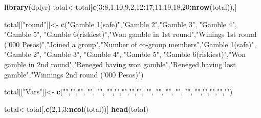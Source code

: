 \documentclass[]{article}
\newenvironment{Shaded}{\begin{snugshade}}{\end{snugshade}}
\newcommand{\KeywordTok}[1]{\textcolor[rgb]{0.13,0.29,0.53}{\textbf{#1}}}
\newcommand{\DecValTok}[1]{\textcolor[rgb]{0.00,0.00,0.81}{#1}}
\newcommand{\StringTok}[1]{\textcolor[rgb]{0.31,0.60,0.02}{#1}}
\newcommand{\OperatorTok}[1]{\textcolor[rgb]{0.81,0.36,0.00}{\textbf{#1}}}
\newcommand{\NormalTok}[1]{#1}
\begin{document}
\begin{Shaded}
\begin{Highlighting}[]
\KeywordTok{library}\NormalTok{(dplyr)}
\NormalTok{total<-total[}\KeywordTok{c}\NormalTok{(}\DecValTok{3}\OperatorTok{:}\DecValTok{8}\NormalTok{,}\DecValTok{1}\NormalTok{,}\DecValTok{10}\NormalTok{,}\DecValTok{9}\NormalTok{,}\DecValTok{2}\NormalTok{,}\DecValTok{12}\OperatorTok{:}\DecValTok{17}\NormalTok{,}\DecValTok{11}\NormalTok{,}\DecValTok{19}\NormalTok{,}\DecValTok{18}\NormalTok{,}\DecValTok{20}\OperatorTok{:}\KeywordTok{nrow}\NormalTok{(total)),]}

\NormalTok{total[[}\StringTok{"round"}\NormalTok{]]<-}\StringTok{ }\KeywordTok{c}\NormalTok{(}\StringTok{"Gamble 1(safe)"}\NormalTok{,}\StringTok{"Gamble 2"}\NormalTok{,}\StringTok{"Gamble 3"}\NormalTok{, }\StringTok{"Gamble 4"}\NormalTok{, }\StringTok{"Gamble 5"}\NormalTok{, }\StringTok{"Gamble 6(riskiest)"}\NormalTok{,}\StringTok{"Won gamble in 1st round"}\NormalTok{,}\StringTok{"Winings 1st round ('000 Pesos)"}\NormalTok{,}\StringTok{"Joined a group"}\NormalTok{,}\StringTok{"Number of co-group members"}\NormalTok{,}\StringTok{"Gamble 1(safe)"}\NormalTok{, }\StringTok{"Gamble 2"}\NormalTok{, }\StringTok{"Gamble 3"}\NormalTok{, }\StringTok{"Gamble 4"}\NormalTok{, }\StringTok{"Gamble 5"}\NormalTok{, }\StringTok{"Gamble 6(riskiest)"}\NormalTok{,}\StringTok{"Won gamble in 2nd round"}\NormalTok{,}\StringTok{"Reneged having won gamble"}\NormalTok{,}\StringTok{"Reneged having lost gamble"}\NormalTok{,}\StringTok{"Winnings 2nd round ('000 Pesos)"}\NormalTok{)}

\NormalTok{total[[}\StringTok{"Vars"}\NormalTok{]]<-}\StringTok{ }\KeywordTok{c}\NormalTok{(}\StringTok{""}\NormalTok{,}\StringTok{""}\NormalTok{,}\StringTok{""}\NormalTok{, }\StringTok{""}\NormalTok{, }\StringTok{""}\NormalTok{, }\StringTok{""}\NormalTok{,}\StringTok{""}\NormalTok{,}\StringTok{""}\NormalTok{,}\StringTok{""}\NormalTok{,}\StringTok{""}\NormalTok{, }\StringTok{""}\NormalTok{, }\StringTok{""}\NormalTok{, }\StringTok{""}\NormalTok{, }\StringTok{""}\NormalTok{, }\StringTok{""}\NormalTok{, }\StringTok{""}\NormalTok{,}\StringTok{""}\NormalTok{,}\StringTok{""}\NormalTok{,}\StringTok{""}\NormalTok{,}\StringTok{""}\NormalTok{)}

\NormalTok{total<-total[,}\KeywordTok{c}\NormalTok{(}\DecValTok{2}\NormalTok{,}\DecValTok{1}\NormalTok{,}\DecValTok{3}\OperatorTok{:}\KeywordTok{ncol}\NormalTok{(total))]}
\KeywordTok{head}\NormalTok{(total)}
\end{Highlighting}
\end{Shaded}
\end{document}
